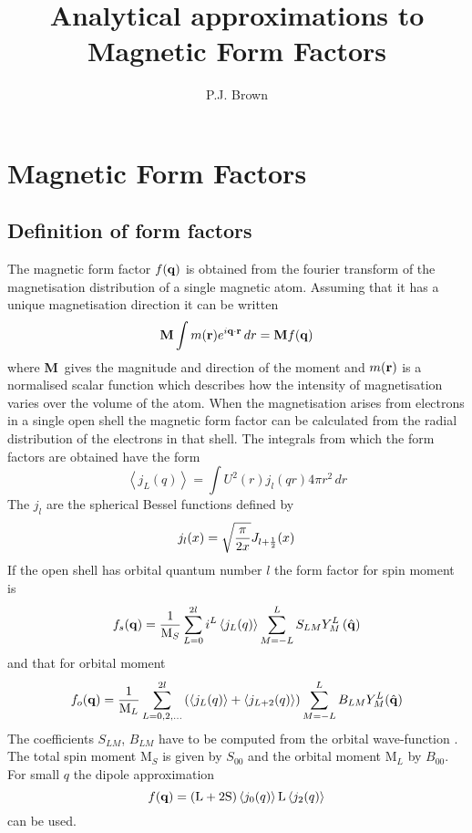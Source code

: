 \documentclass[onecolumn,12pt,a4paper,]{report}
\title{Analytical approximations to Magnetic Form Factors}
\author{P.J. Brown}
\def\kpv{{\bf{q}}}
\def\kp{q}
\def\kpu{\hat{\bf{q}}}
\def\rv{{\bf r}}
\def\Mv{{\bf M}}
\def\n{\relax}
\begin{document}
\maketitle
\chapter{Magnetic Form Factors}
\section{Definition of form factors}
The magnetic form factor  $f(\kpv)$ is obtained from the fourier transform of
the  magnetisation distribution of a single magnetic atom. Assuming that it
has a unique magnetisation direction it can be written
\begin{equation}
\Mv\int 
m(\rv)e^{i\kpv\cdot\rv}\,dr=\Mv f(\kpv)
\end{equation}
where \Mv\ gives the magnitude and direction of the moment and $m(\rv)$ is
a normalised scalar function  which describes how the intensity of magnetisation 
varies over the volume of the atom.
When the magnetisation arises from electrons in a single open shell the magnetic
form factor can be calculated from the radial distribution of the electrons in
that shell. The integrals from which the form factors are obtained have the form
\begin{equation}
\left\langle j_L(\kp)\right\rangle= \int 
U^2(r)j_l(\kp r)4\pi r^2\,dr
\end{equation}
The $j_l$ are the spherical Bessel functions defined by
\begin{equation}
j_l(x)={\sqrt{\pi\over2x}}J_{l+\frac12}(x)
\end{equation}
If the open shell has orbital quantum number $l$ the form factor 
for spin moment is 
\begin{equation}
f_s(\kpv)=\frac1{\mathrm{M}_S}\sum_{L=0}^{2l}i^L\left\langle 
j_L(\kp)\right\rangle
\sum_{M=-L}^L
S_{LM}Y^L_M\left({\kpu}\right)
\end{equation}
and that for orbital moment 
\begin{equation}
f_o(\kpv)=\frac1{\mathrm{M}_L}\sum_{L=0,2,\ldots}^{2l}
\left(\left\langle j_L(\kp)\right\rangle +
\left\langle j_{L+2}(\kp)\right\rangle\right)
\sum_{M=-L}^LB_{LM}Y^L_M(\kpu)
\end{equation}
\n
The coefficients $S_{LM}$, $B_{LM}$ have to be computed from the  orbital
wave-function \cite{Marshall}. The total spin moment ${\mathrm{M}_S}$ is  
given by $S_{00}$ 
and the orbital moment  ${\mathrm{M}_L}$ by $B_{00}$. For small $\kp$ the dipole
approximation 
\begin{equation}
f(\kpv)=({\mathrm{L+2S})}\left\langle j_0(\kp)\right\rangle
{\mathrm{L}}\left\langle j_2(\kp)\right\rangle
\end{equation}
can be used.
\\[2ex]
\end{document}
